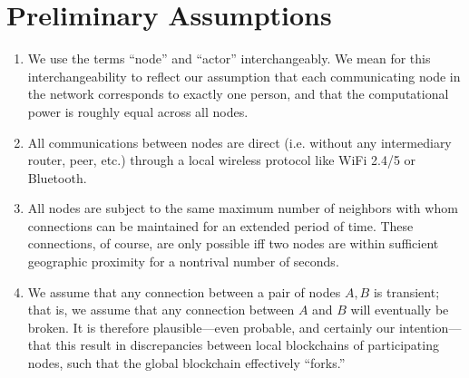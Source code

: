 \documentclass{article}
\begin{document}
\section*{Preliminary Assumptions}
\begin{enumerate}
	\item We use the terms ``node'' and ``actor'' interchangeably. We mean for this
		interchangeability to reflect our assumption that each communicating
		node in the network corresponds to exactly one person, and that the
		computational power is roughly equal across all nodes.
	\item All communications between nodes are direct (i.e. without any intermediary
		router, peer, etc.) through a local wireless protocol like WiFi 2.4/5 or
		Bluetooth.
	\item All nodes are subject to the same maximum number of neighbors with whom
		connections can be maintained for an extended period of time. These
		connections, of course, are only possible iff two nodes are within
		sufficient geographic proximity for a nontrival number of seconds.
	\item We assume that any connection between a pair of nodes $A,B$ is transient;
		that is, we assume that any connection between $A$ and $B$ will eventually
		be broken. It is therefore plausible---even probable, and certainly our
		intention---that this result in discrepancies between local blockchains
		of participating nodes, such that the global blockchain effectively
		``forks.''
\end{enumerate}
\end{document}
